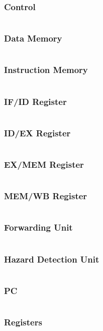 \documentclass{article}[12pt]
\begin{document}
		\subsubsection{Control}
			\inputminted{verilog}{pipeline/Control.v}
		\subsubsection{Data Memory}
			\inputminted{verilog}{pipeline/DataMemory.v}
		\subsubsection{Instruction Memory}
			\inputminted{verilog}{pipeline/InstructionMemory.v}
		\subsubsection{IF/ID Register}
			\inputminted{verilog}{pipeline/IF_ID.v}
		\subsubsection{ID/EX Register}
			\inputminted{verilog}{pipeline/ID_EX.v}
		\subsubsection{EX/MEM Register}
			\inputminted{verilog}{pipeline/EX_MEM.v}
		\subsubsection{MEM/WB Register}
			\inputminted{verilog}{pipeline/MEM_WB.v}
		\subsubsection{Forwarding Unit}
			\inputminted{verilog}{pipeline/ForwardingUnit.v}
		\subsubsection{Hazard Detection Unit}
			\inputminted{verilog}{pipeline/HazardDetectionUnit.v}
		\subsubsection{PC}
			\inputminted{verilog}{pipeline/PC.v}
		\subsubsection{Registers}
			\inputminted{verilog}{pipeline/Register.v}
\end{document}
